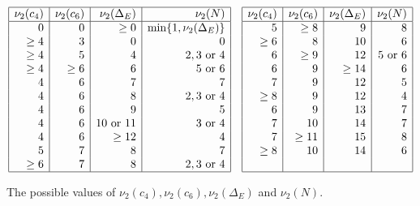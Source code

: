 \begin{table}[h]
$$
\begin{array}{|r|r|r|r|}
\hline
\nu_2 (c_4) & \nu_2 (c_6) & \nu_2 (\Delta_E) & \nu_2 (N)  \\ \hline
0 & 0 & \geq 0  & \min \{ 1, \nu_2 (\Delta_E)  \}  \\
\geq 4 &  3 & 0 & 0  \\
\geq 4 & 5 & 4 & 2, 3 \mbox{ or } 4  \\
\geq 4 & \geq 6 & 6 & 5 \mbox{ or } 6  \\
4 & 6 & 7 & 7  \\
4 & 6 & 8 & 2, 3 \mbox{ or } 4  \\
4 & 6 & 9 &  5   \\
4 & 6 & 10 \mbox{ or } 11 & 3 \mbox{ or } 4   \\
4 & 6 & \geq 12 &  4  \\
5 & 7 & 8 & 7  \\
\geq 6 & 7 & 8 & 2, 3 \mbox{ or } 4  \\
\hline
\end{array}
\quad
\begin{array}{|r|r|r|r|}
\hline
\nu_2 (c_4) & \nu_2 (c_6) & \nu_2 (\Delta_E) & \nu_2 (N)  \\ \hline
 5 & \geq 8 & 9 & 8 \\
  \geq 6 & 8 & 10 & 6 \\
 6 & \geq 9 & 12 & 5 \mbox{ or } 6 \\
 6 & 9 & \geq 14 &  6 \\
 7 & 9 & 12 & 5 \\
  \geq 8 & 9 & 12 & 4 \\
 6 & 9 & 13 & 7 \\
 7 & 10 & 14 & 7 \\
 7 & \geq 11 & 15 & 8 \\
  \geq 8 &  10 & 14 & 6 \\
  & & & \\
\hline
\end{array}
$$


\caption{The possible values of $\nu_2(c_4), \nu_2(c_6), \nu_2(\Delta_E)$ and $\nu_2(N)$.}
\label{tab nu2}
\end{table}

